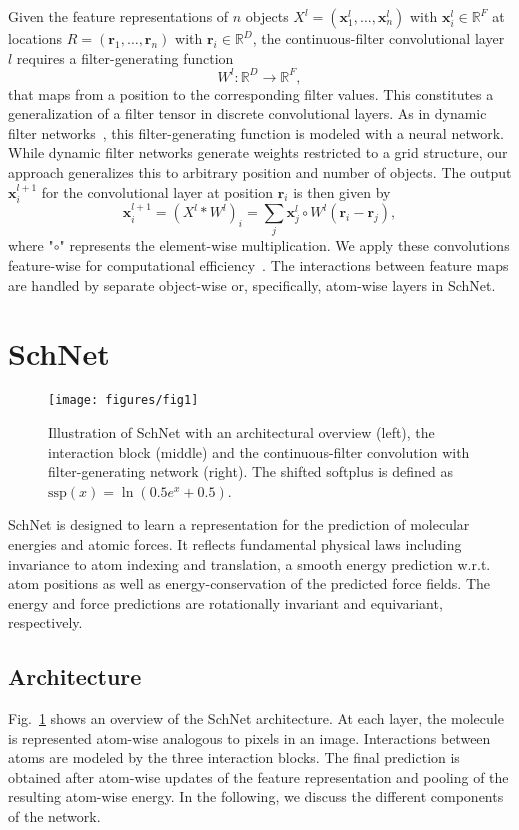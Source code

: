 \documentclass{article}
\newcommand{\rr}{\mathbf{r}}
\newcommand{\x}{\mathbf{x}}
\begin{document}
Given the feature representations of $n$ objects $X^l = (\x^l_1,\ldots,\x^l_n)$ with $\x^l_i \in \mathbb{R}^F$ at locations $R =(\rr_1,\ldots,\rr_n)$ with $\rr_i \in \mathbb{R}^D$, the continuous-filter convolutional layer $l$ requires a filter-generating function
\[
W^l: \mathbb{R}^D \rightarrow \mathbb{R}^F,
\]
that maps from a position to the corresponding filter values.
This constitutes a generalization of a filter tensor in discrete convolutional layers.
As in dynamic filter networks~\citep{BrabandereJTG16}, this filter-generating function is modeled with a neural network. 
While dynamic filter networks generate weights restricted to a grid structure, our approach generalizes this to arbitrary position and number of objects.
The output $\x_i^{l+1}$ for the convolutional layer at position $\rr_i$ is then given by
\begin{equation}
\x_i^{l+1} = (X^l * W^l)_i = \sum_{j} \x^l_j \circ W^l(\rr_i - \rr_j),
\end{equation}
where "$\circ$" represents the element-wise multiplication. 
We apply these convolutions feature-wise for computational efficiency~\citep{chollet2016xception}.
The interactions between feature maps are handled by separate object-wise or, specifically, atom-wise layers in SchNet.


\section{SchNet}
\begin{figure}
\centering
\texttt{[image: figures/fig1]}
\caption{Illustration of SchNet with an architectural overview (left), the interaction block (middle) and the continuous-filter convolution with filter-generating network (right). The shifted softplus is defined as $\text{ssp}(x) = \ln(0.5e^x + 0.5)$.}\label{fig:architecture}
\end{figure}
SchNet is designed to learn a representation for the prediction of molecular energies and atomic forces.
It reflects fundamental physical laws including invariance to atom indexing and translation, a smooth energy prediction w.r.t. atom positions as well as energy-conservation of the predicted force fields.
The energy and force predictions are rotationally invariant and equivariant, respectively.

\subsection{Architecture}
Fig.~\ref{fig:architecture} shows an overview of the SchNet architecture. 
At each layer, the molecule is represented atom-wise analogous to pixels in an image. Interactions between atoms are modeled by the three interaction blocks.
The final prediction is obtained after atom-wise updates of the feature representation and pooling of the resulting atom-wise energy.
In the following, we discuss the different components of the network.
\end{document}
